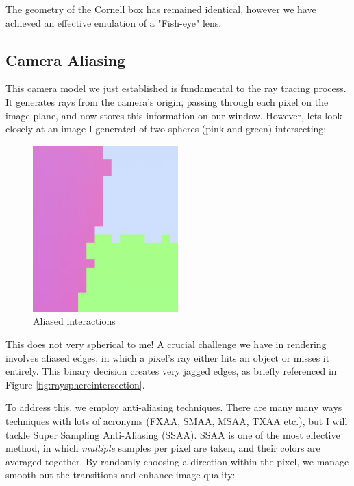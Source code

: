 \documentclass[12pt]{article}
\begin{document}
The geometry of the Cornell box has remained identical, however we have achieved an effective emulation of a "Fish-eye" lens.

\subsection{Camera Aliasing}
This camera model we just established is fundamental to the ray tracing process. It generates rays from the camera's origin, passing through each pixel on the image plane, and now stores this information on our window. However, lets look closely at an image I generated of two spheres (pink and green) intersecting:

\begin{figure}[H]
    \centering
    \includegraphics[width=0.5\textwidth]{images/aliasing/no-aliasing.png}
    \caption{Aliased interactions}
    \label{fig:aliasedintersection}
\end{figure}

This does not very spherical to me! A crucial challenge we have in rendering involves aliased edges, in which a pixel's ray either hits an object or misses it entirely. This binary decision creates very jagged edges, as briefly referenced in Figure \ref{fig:raysphereintersection}.

To address this, we employ anti-aliasing techniques. There are many many ways techniques with lots of acronyms (FXAA, SMAA, MSAA, TXAA etc.), but I will tackle Super Sampling Anti-Aliasing (SSAA). SSAA is one of the most effective method, in which \textit{multiple} samples per pixel are taken, and their colors are averaged together. By randomly choosing a direction within the pixel, we manage smooth out the transitions and enhance image quality:
\end{document}
